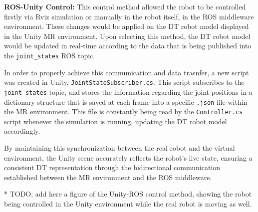         

    \textbf{\ac{ROS}-Unity Control:} This control method allowed the robot to be controlled firstly via Rviz simulation or manually in the robot itself, in the \ac{ROS} middleware environment. These changes would be applied on the \ac{DT} robot model displayed in the Unity \ac{MR} environment. Upon selecting this method, the \ac{DT} robot model would be updated in real-time according to the data that is being published into the \texttt{joint\_states} \ac{ROS} topic.
    
    In order to properly achieve this communication and data trasnfer, a new script was created in Unity, \texttt{JointStateSubscriber.cs}. This script subscribes to the \texttt{joint\_states} topic, and stores the information regarding the joint positions in a dictionary structure that is saved at each frame into a specific \texttt{.json} file within the \ac{MR} environment. This file is constantly being read by the \texttt{Controller.cs} script whenever the simulation is running, updating the \ac{DT} robot model accordingly.
    
    By maintaining this synchronization between the real robot and the virtual environment, the Unity scene accurately reflects the robot's live state, ensuring a consistent \ac{DT} representation through the bidirectional communication established between the \ac{MR} environment and the \ac{ROS} middleware.

    * TODO: add here a figure of the Unity-ROS control method, showing the robot being controlled in the Unity environment while the real robot is moving as well.

